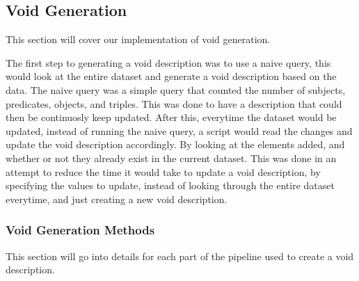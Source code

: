 \subsection{Void Generation}\label{sec:void}
This section will cover our implementation of void generation.

The first step to generating a \gls{void} description was to use a naive query, this would look at the entire dataset and generate a \gls{void} description based on the data. The naive query was a simple query that counted the number of subjects, predicates, objects, and triples. This was done to have a description that could then be continuosly keep updated. After this, everytime the dataset would be updated, instead of running the naive query, a script would read the changes and update the \gls{void} description accordingly. By looking at the elements added, and whether or not they already exist in the current dataset. This was done in an attempt to reduce the time it would take to update a \gls{void} description, by specifying the values to update, instead of looking through the entire dataset everytime, and just creating a new \gls{void} description.

\subsubsection{Void Generation Methods}\label{sec:voidmethods}
This section will go into details for each part of the pipeline used to create a void description.


